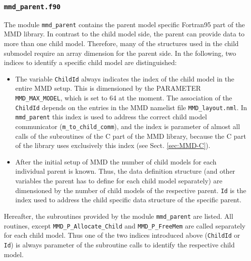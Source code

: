 \documentclass[twoside]{article}
\begin{document}
\subsubsection{{\tt mmd\_parent.f90}}\label{sec:mmd-parent}

The module \verb|mmd_parent| contains the parent model specific Fortran95
part of the MMD library. In contrast to
the child model side, the parent can provide data to more than one child model.
Therefore, many of the structures used in the child submodel require an array 
dimension for the parent side.
In the following, two indices to identify a specific child model are
distinguished: 
\begin{itemize}
\item The variable \verb|ChildId| always indicates the index of the child
 model in the entire MMD setup. This is dimensioned by the 
{\footnotesize PARAMETER} \verb|MMD_MAX_MODEL|, which is set to 64 at
the moment.  
The association of the \verb|ChildId| depends on the entries in the MMD 
namelist file \verb|MMD_layout.nml|. In \verb|mmd_parent| this index is used to 
address the correct child model communicator (\verb|m_to_child_comm|), and
the index is parameter of almost all calls of the subroutines of the C
part of the MMD library, because the C part of the library uses
exclusively this index (see Sect. \ref{sec:MMD-C}). 
\item After the initial setup of MMD the number of child models for each
 individual parent is known. Thus, the data definition structure (and other 
variables the parent has to define for each child model separately) are 
dimensioned by the number of child models of the respective
parent. \verb|Id| is the index used to address the child specific data
structure of the specific parent.
\end{itemize}

Hereafter, the subroutines provided by the module \verb|mmd_parent|
are listed. All routines, except \verb|MMD_P_Allocate_Child| and 
\verb|MMD_P_FreeMem| are called separately for each child model. 
Thus one of the two indices introduced above (\verb|ChildId| or \verb|Id|) is
always parameter of the subroutine calls to identify the respective
 child model.
\end{document}
